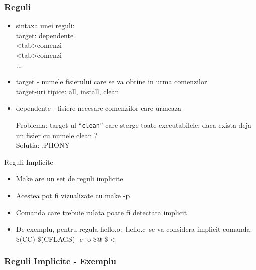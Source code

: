 \documentclass{beamer}
\begin{document}
    \begin{frame}[allowframebreaks]
    \frametitle{Reguli}
    \begin{itemize}
    \setlength{\itemsep}{0.3cm}
    \item sintaxa unei reguli:\\ {\ttfamily target: dependente\\ <tab>comenzi\\ <tab>comenzi\\ ...}
    \item target - numele fisierului care se va obtine in urma comenzilor\\target-uri tipice: all, install, clean
    \item dependente - fisiere necesare comenzilor care urmeaza
    \begin{item} Problema: target-ul ``\texttt{clean}'' care sterge toate executabilele: daca exista deja un fisier cu numele clean ?\\Solutia: .PHONY\\
    \vspace{0.3cm}
    
    \end{item}
    \end{itemize}
    \end{frame}

    \begin{frame}{Reguli Implicite}
    \begin{itemize}
    \setlength{\itemsep}{0.5cm}
    \item Make are un set de reguli implicite
    \item Acestea pot fi vizualizate cu {\ttfamily make -p}
    \item Comanda care trebuie rulata poate fi detectata implicit
    \item De exemplu, pentru regula {\ttfamily hello.o:\ hello.c}\ se va considera implicit comanda:\\ {\ttfamily \$(CC) \$(CFLAGS) -c -o \$@ \$$<$}
    \end{itemize}
    \end{frame}

    \begin{frame}[allowframebreaks]
    \frametitle{Reguli Implicite - Exemplu}
    \\
    \framebreak
    \\
    \framebreak
    \\
    \framebreak
    
    \end{frame}
\end{document}
